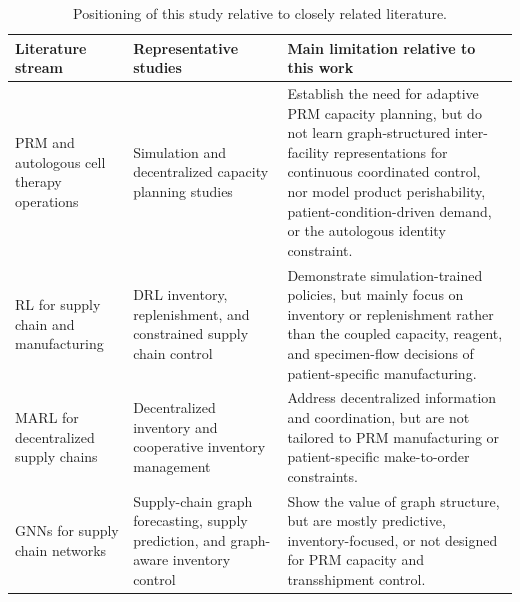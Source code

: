 \documentclass[preprint,review,12pt,nonatbib]{elsarticle}
\providecommand{\DIFadd}[1]{{\protect\color{blue}#1}} %
\providecommand{\DIFdel}[1]{} %
\providecommand{\DIFaddFL}[1]{\DIFadd{#1}} %
\providecommand{\DIFdelFL}[1]{\DIFdel{#1}} %
\providecommand{\DIFaddbeginFL}{} %
\providecommand{\DIFaddendFL}{} %
\providecommand{\DIFdelbeginFL}{} %
\providecommand{\DIFdelendFL}{} %
\providecommand{\DIFscaledelfig}{0.5}
\newlength{\DIFdelgraphicswidth} %
\newlength{\DIFdelgraphicsheight} %
\providecommand{\DIFaddincludegraphics}[2][]{{\color{blue}\fbox{\DIFOincludegraphics[#1]{#2}}}} %
\providecommand{\DIFdelincludegraphics}[2][]{%
\sbox{\DIFdelgraphicsbox}{\DIFOincludegraphics[#1]{#2}}%
\settoboxwidth{\DIFdelgraphicswidth}{\DIFdelgraphicsbox} %
\settoboxtotalheight{\DIFdelgraphicsheight}{\DIFdelgraphicsbox} %
\scalebox{\DIFscaledelfig}{%
\parbox[b]{\DIFdelgraphicswidth}{\usebox{\DIFdelgraphicsbox}\\[-\baselineskip] \rule{\DIFdelgraphicswidth}{0em}}\llap{\resizebox{\DIFdelgraphicswidth}{\DIFdelgraphicsheight}{%
\setlength{\unitlength}{\DIFdelgraphicswidth}%
\begin{picture}(1,1)%
\thicklines\linethickness{2pt} %
{\color[rgb]{1,0,0}\put(0,0){\framebox(1,1){}}}%
{\color[rgb]{1,0,0}\put(0,0){\line( 1,1){1}}}%
{\color[rgb]{1,0,0}\put(0,1){\line(1,-1){1}}}%
\end{picture}%
}\hspace*{3pt}}} %
} %
\DeclareRobustCommand{\DIFaddbeginFL}{\DIFOaddbeginFL \let\includegraphics\DIFaddincludegraphics} %
\DeclareRobustCommand{\DIFaddendFL}{\DIFOaddendFL \let\includegraphics\DIFOincludegraphics} %
\DeclareRobustCommand{\DIFdelbeginFL}{\DIFOdelbeginFL \let\includegraphics\DIFdelincludegraphics} %
\DeclareRobustCommand{\DIFdelendFL}{\DIFOaddendFL \let\includegraphics\DIFOincludegraphics} %
\begin{document}
\begin{table}[htbp]
\centering
\small
\caption{Positioning of this study relative to closely related literature.}
\label{tab:lit_positioning}
\setlength{\tabcolsep}{4pt}
\renewcommand{\arraystretch}{1.12}
\begin{tabularx}{\textwidth}{p{} p{} X}
\toprule
Literature stream & Representative studies & Main limitation relative to this work \\
\midrule
PRM and autologous cell therapy operations & Simulation and decentralized capacity planning studies~\cite{Wang2023SimulationBased,Li2023,Tseng2023DeepRL} & Establish the need for adaptive PRM capacity planning, but do not \DIFdelbeginFL \DIFdelFL{explicitly }\DIFdelendFL learn graph-structured inter-facility representations for continuous coordinated control\DIFaddbeginFL \DIFaddFL{, nor model product perishability, patient-condition-driven demand, or the autologous identity constraint}\DIFaddendFL . \\
RL for supply chain and manufacturing & DRL inventory, replenishment, and constrained supply chain control~\DIFdelbeginFL \DIFdelFL{\mbox{%
\cite{article1,article2,Bermudez2023DCPO,Stranieri2025PharmaDRL,Eisenach2024NeuralCoordination} }\hskip0pt%
}\DIFdelendFL \DIFaddbeginFL \DIFaddFL{\mbox{%
\cite{Oroojlooyjadid2022BeerGame,Bermudez2023DCPO,Stranieri2025PharmaDRL,Eisenach2024NeuralCoordination} }\hskip0pt%
}\DIFaddendFL & Demonstrate simulation-trained policies, but mainly focus on inventory or replenishment rather than \DIFaddbeginFL \DIFaddFL{the }\DIFaddendFL coupled capacity, reagent, and specimen-flow decisions \DIFaddbeginFL \DIFaddFL{of patient-specific manufacturing}\DIFaddendFL . \\
MARL for decentralized supply chains & Decentralized inventory and cooperative inventory management~\cite{Mousa2023DecInvMARL,Leluc2023MARLIM} & Address decentralized information and coordination, but are not tailored to PRM manufacturing or patient-specific make-to-order constraints. \\
GNNs for supply chain networks & Supply-chain graph forecasting, supply prediction, and graph-aware inventory control~\cite{Chang2025AAAI,Ahn2024GSP,Ahn2024GPP,Kotecha2024GNNMARL} & Show the value of graph structure, but are mostly predictive, inventory-focused, or not designed for PRM capacity and transshipment control. \\
\bottomrule
\end{tabularx}
\end{table}
\end{document}
